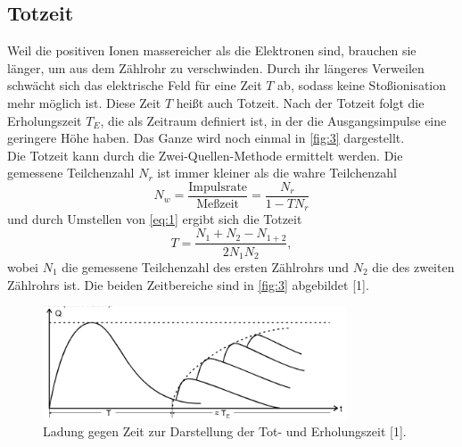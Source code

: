 \subsection{Totzeit}
Weil die positiven Ionen massereicher als die Elektronen sind, brauchen sie länger, um aus dem Zählrohr zu verschwinden. Durch ihr längeres Verweilen schwächt sich das elektrische Feld für eine Zeit $T$ ab, sodass keine Stoßionisation mehr möglich ist. Diese Zeit $T$ heißt auch Totzeit. Nach der Totzeit folgt die Erholungszeit $T_E$, die als Zeitraum definiert ist, in der die Ausgangsimpulse eine geringere Höhe haben. Das Ganze wird noch einmal in \autoref{fig:3} dargestellt.\\
Die Totzeit kann durch die Zwei-Quellen-Methode ermittelt werden. Die gemessene Teilchenzahl $N_r$ ist immer kleiner als die wahre Teilchenzahl
\begin{equation}
  N_w=\frac{\textrm{Impulsrate}}{\textrm{Meßzeit}}=\frac{N_r}{1-TN_r}
  \label{eq:1}
\end{equation}
und durch Umstellen von \eqref{eq:1} ergibt sich die Totzeit
\begin{equation}
  T=\frac{N_1+N_2-N_{1+2}}{2N_{1}N_{2}},
  \label{eq:2}
\end{equation}
wobei $N_1$ die gemessene Teilchenzahl des ersten Zählrohrs und $N_2$ die des zweiten Zählrohrs ist. 
Die beiden Zeitbereiche sind in \autoref{fig:3} abgebildet [1].
\begin{figure}[H] 
  \centering 
  \includegraphics[width=9cm]{3} 
  \caption{Ladung gegen Zeit zur Darstellung der Tot- und Erholungszeit [1].} 
  \label{fig:3} 
\end{figure}



